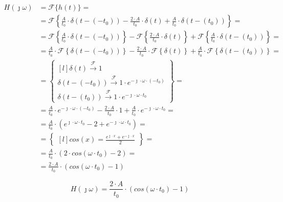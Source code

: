 \begin{task}
\begin{align*}
H(\jmath \omega)&={\mathcal F}\{h(t)\}=\\
&={\mathcal F}\left\{\frac{A}{t_{0}} \cdot \delta(t-(-t_{0})) -\frac{2 \cdot A}{t_{0}} \cdot \delta(t) + \frac{A}{t_{0}} \cdot \delta(t-(t_{0}))\right\}=\\
&={\mathcal F}\left\{\frac{A}{t_{0}} \cdot \delta(t-(-t_{0}))\right\} - {\mathcal F}\left\{\frac{2 \cdot A}{t_{0}} \cdot \delta(t)\right\} + {\mathcal F}\left\{\frac{A}{t_{0}} \cdot \delta(t-(t_{0}))\right\}=\\
&=\frac{A}{t_{0}} \cdot {\mathcal F}\left\{\delta(t-(-t_{0}))\right\} - \frac{2 \cdot A}{t_{0}} \cdot {\mathcal F}\left\{\delta(t)\right\} + \frac{A}{t_{0}} \cdot {\mathcal F}\left\{\delta(t-(t_{0}))\right\}=\\
&=\begin{Bmatrix*}[l]
\delta(t)\xrightarrow{\mathcal F} 1\\
\delta(t-(-t_{0}))\xrightarrow{\mathcal F} 1 \cdot e^{-\jmath \cdot \omega \cdot (-t_{0})}\\
\delta(t-(t_{0}))\xrightarrow{\mathcal F} 1 \cdot e^{-\jmath \cdot \omega \cdot t_{0}}
\end{Bmatrix*}=\\
&=\frac{A}{t_{0}} \cdot e^{-\jmath \cdot \omega \cdot (-t_{0})} - \frac{2 \cdot A}{t_{0}} \cdot 1 + \frac{A}{t_{0}} \cdot e^{-\jmath \cdot \omega \cdot t_{0}}=\\
&=\frac{A}{t_{0}} \cdot \left(e^{\jmath \cdot \omega \cdot t_{0}} -2 + e^{-\jmath \cdot \omega \cdot t_{0}}\right)=\\
&=\begin{Bmatrix*}[l]
cos(x)=\frac{e^{\jmath \cdot x} + e^{-\jmath \cdot x}}{2}
\end{Bmatrix*}=\\
&=\frac{A}{t_{0}} \cdot \left(2 \cdot cos(\omega \cdot t_{0}) -2\right)=\\
&=\frac{2 \cdot A}{t_{0}} \cdot \left(cos(\omega \cdot t_{0}) -1\right)
\end{align*}


\begin{equation}
H(\jmath \omega) = \frac{2 \cdot A}{t_{0}} \cdot \left(cos(\omega \cdot t_{0}) -1\right)
\end{equation}



\end{task}
